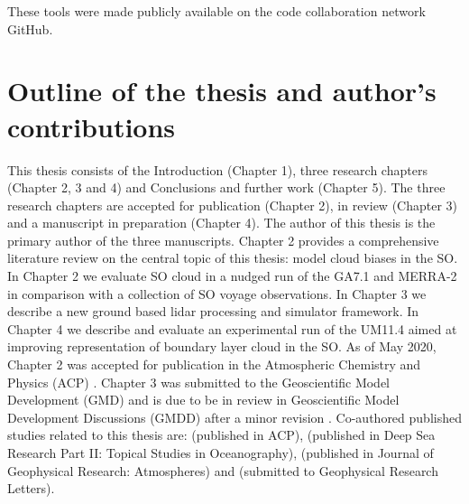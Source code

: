 \noindent
These tools were made publicly available on the code collaboration network
GitHub.

\section{Outline of the thesis and author's contributions}

This thesis consists of the Introduction (Chapter 1), three research chapters
(Chapter 2, 3 and 4) and Conclusions and further work (Chapter 5). The three
research chapters are accepted for publication (Chapter 2),
in review (Chapter 3) and a manuscript in preparation (Chapter 4).
The author of this thesis is the primary author of the three manuscripts.
Chapter 2 provides a comprehensive literature review on the central topic
of this thesis: model cloud biases in the SO. In Chapter 2 we evaluate
SO cloud in a nudged run of the GA7.1 and MERRA-2 in comparison
with a collection of SO voyage observations. In Chapter 3 we
describe a new ground based lidar processing and simulator framework.
In Chapter 4 we describe and evaluate an experimental run of the UM11.4 aimed at
improving representation of boundary layer cloud in the SO.
As of May 2020, Chapter 2 was accepted for publication in the Atmospheric
Chemistry and Physics (ACP) \citep{kuma2020a}. Chapter 3 was submitted to the
Geoscientific Model Development (GMD) and is due to be in review
in Geoscientific Model Development Discussions (GMDD) after a minor revision \citep{kuma2020b}.
Co-authored published studies related to this thesis are: \cite{jolly2018}
(published in ACP), \cite{klekociuk2018} (published in Deep Sea Research Part II: Topical Studies in Oceanography), \cite{hartery2020a}
(published in Journal of Geophysical Research: Atmospheres) and
\cite{hartery2020b} (submitted to Geophysical Research Letters).
